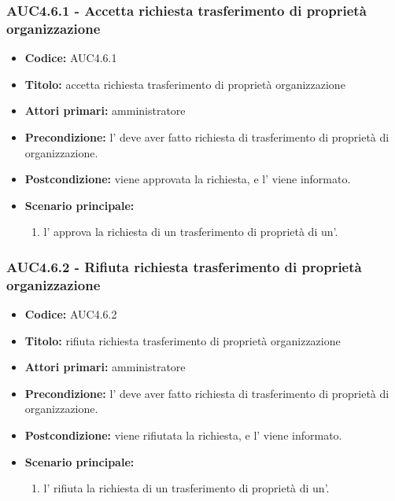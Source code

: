 \documentclass[casi-duso]{subfiles}
\begin{document}
\subsubsection{AUC4.6.1 - Accetta richiesta trasferimento di proprietà organizzazione}%
\label{subsub:AUC4.6.1}
\begin{itemize}
  \item \textbf{Codice:} AUC4.6.1
  \item \textbf{Titolo:} accetta richiesta trasferimento di proprietà organizzazione
  \item \textbf{Attori primari:} amministratore
  \item \textbf{Precondizione:} l' deve aver fatto richiesta di trasferimento di proprietà di organizzazione.
  \item \textbf{Postcondizione:} viene approvata la richiesta, e l' viene informato.
  \item \textbf{Scenario principale:}
  \begin{enumerate}
    \item l' approva la richiesta di un trasferimento di proprietà di un'.
  \end{enumerate}
\end{itemize}  

\subsubsection{AUC4.6.2 - Rifiuta richiesta trasferimento di proprietà organizzazione}%
\label{subsub:AUC4.6.2}
\begin{itemize}
  \item \textbf{Codice:} AUC4.6.2
  \item \textbf{Titolo:} rifiuta richiesta trasferimento di proprietà organizzazione
  \item \textbf{Attori primari:} amministratore
  \item \textbf{Precondizione:} l' deve aver fatto richiesta di trasferimento di proprietà di organizzazione.
  \item \textbf{Postcondizione:} viene rifiutata la richiesta, e l' viene informato.
  \item \textbf{Scenario principale:}
  \begin{enumerate}
    \item  l' rifiuta la richiesta di un trasferimento di proprietà di un'.
  \end{enumerate}
\end{itemize}
\end{document}
